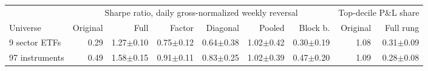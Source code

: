 \begin{tabular}{lrrrrrrrr}
\toprule
 & \multicolumn{6}{c}{Sharpe ratio, daily gross-normalized weekly reversal} & \multicolumn{2}{c}{Top-decile P\&L share} \\
\cmidrule(lr){2-7}\cmidrule(lr){8-9}
Universe & Original & Full & Factor & Diagonal & Pooled & Block b. & Original & Full rung \\
\midrule
9 sector ETFs & 0.29 & 1.27$\pm$0.10 & 0.75$\pm$0.12 & 0.64$\pm$0.38 & 1.02$\pm$0.42 & 0.30$\pm$0.19 & 1.08 & 0.31$\pm$0.09 \\
97 instruments & 0.49 & 1.58$\pm$0.15 & 0.91$\pm$0.11 & 0.83$\pm$0.25 & 1.02$\pm$0.39 & 0.47$\pm$0.20 & 1.09 & 0.28$\pm$0.08 \\
\bottomrule
\end{tabular}